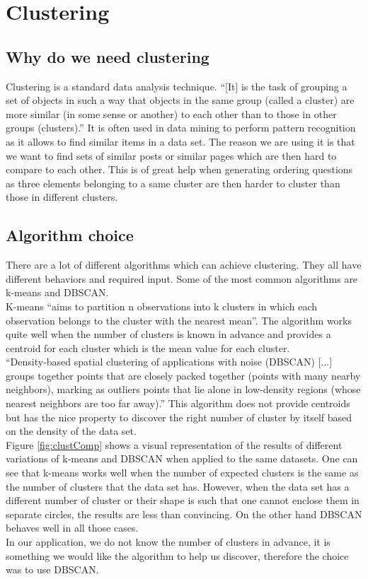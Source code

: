 \section{Clustering}
\subsection{Why do we need clustering}
Clustering is a standard data analysis technique. ``[It] is the task of grouping a set of objects in such a way that objects in the same group (called a cluster) are more similar (in some sense or another) to each other than to those in other groups (clusters).''\cite{clustering} It is often used in data mining to perform pattern recognition as it allows to find similar items in a data set. The reason we are using it is that we want to find sets of similar posts or similar pages which are then hard to compare to each other. This is of great help when generating ordering questions as three elements belonging to a same cluster are then harder to cluster than those in different clusters.
\subsection{Algorithm choice}
There are a lot of different algorithms which can achieve clustering. They all have different behaviors and required input. Some of the most common algorithms are k-means and DBSCAN.\\
K-means ``aims to partition n observations into k clusters in which each observation belongs to the cluster with the nearest mean''\cite{kmeans}. The algorithm works quite well when the number of clusters is known in advance and provides a centroid for each cluster which is the mean value for each cluster.\\
``Density-based spatial clustering of applications with noise (DBSCAN) [...] groups together points that are closely packed together (points with many nearby neighbors), marking as outliers points that lie alone in low-density regions (whose nearest neighbors are too far away).''\cite{dbscan} This algorithm does not provide centroids but has the nice property to discover the right number of cluster by itself based on the density of the data set.\\
Figure \ref{fig:clustComp} shows a visual representation of the results of different variations of k-means and DBSCAN when applied to the same datasets. One can see that k-means works well when the number of expected clusters is the same as the number of clusters that the data set has. However, when the data set has a different number of cluster or their shape is such that one cannot enclose them in separate circles, the results are less than convincing. On the other hand DBSCAN behaves well in all those cases.\\
In our application, we do not know the number of clusters in advance, it is something we would like the algorithm to help us discover, therefore the choice was to use DBSCAN.

